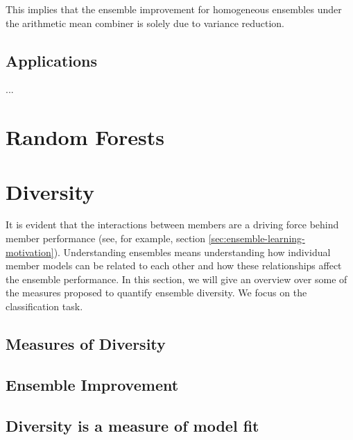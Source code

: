 \documentclass[
    a4paper, %
	fontsize=10pt, %
	twoside=false, %
]{kaobook}
\begin{document}
This implies that the ensemble improvement for homogeneous ensembles under the arithmetic mean combiner is solely due to variance reduction.


\section{Applications}
...

\chapter{Random Forests}


\chapter{Diversity}

It is evident that the interactions between members are a driving force behind member performance (see, for example, section \ref{sec:ensemble-learning-motivation}). Understanding ensembles means understanding how individual member models can be related to each other and how these relationships affect the ensemble performance. In this section, we will give an overview over some of the measures proposed to quantify ensemble diversity. We focus on the classification task. 

\section{Measures of Diversity}





\section{Ensemble Improvement}



\section{Diversity is a measure of model fit}

\end{document}
